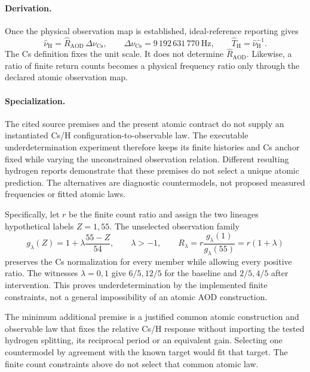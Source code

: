 \paragraph{Derivation.}
Once the physical observation map is established, ideal-reference reporting gives
\begin{equation}
\widehat\nu_{\mathrm H}=\widehat R_{\mathrm{AOD}}\,\Delta\nu_{\mathrm{Cs}},
\qquad
\Delta\nu_{\mathrm{Cs}}=9\,192\,631\,770\ \mathrm{Hz},
\qquad
\widehat T_{\mathrm H}=\widehat\nu_{\mathrm H}^{-1}.
\label{eq:manual2-si-prediction}
\end{equation}
The Cs definition fixes the unit scale. It does not determine \(\widehat R_{\mathrm{AOD}}\). Likewise, a ratio of finite return counts becomes a physical frequency ratio only through the declared atomic observation map.

\paragraph{Specialization.}
The cited source premises and the present atomic contract do not supply an instantiated Cs/H configuration-to-observable law. The executable underdetermination experiment therefore keeps its finite histories and Cs anchor fixed while varying the unconstrained observation relation. Different resulting hydrogen reports demonstrate that these premises do not select a unique atomic prediction. The alternatives are diagnostic countermodels, not proposed measured frequencies or fitted atomic laws.

Specifically, let \(r\) be the finite count ratio and assign the two lineages hypothetical labels \(Z=1,55\). The unselected observation family
\begin{equation}
g_\lambda(Z)=1+\lambda\frac{55-Z}{54},\qquad
\lambda>-1,\qquad
R_\lambda=r\frac{g_\lambda(1)}{g_\lambda(55)}=r(1+\lambda)
\label{eq:manual2-observation-freedom}
\end{equation}
preserves the Cs normalization for every member while allowing every positive ratio. The witnesses \(\lambda=0,1\) give \(6/5,12/5\) for the baseline and \(2/5,4/5\) after intervention. This proves underdetermination by the implemented finite constraints, not a general impossibility of an atomic AOD construction.

The minimum additional premise is a justified common atomic construction and observable law that fixes the relative Cs/H response without importing the tested hydrogen splitting, its reciprocal period or an equivalent gain. Selecting one countermodel by agreement with the known target would fit that target. The finite count constraints above do not select that common atomic law.

